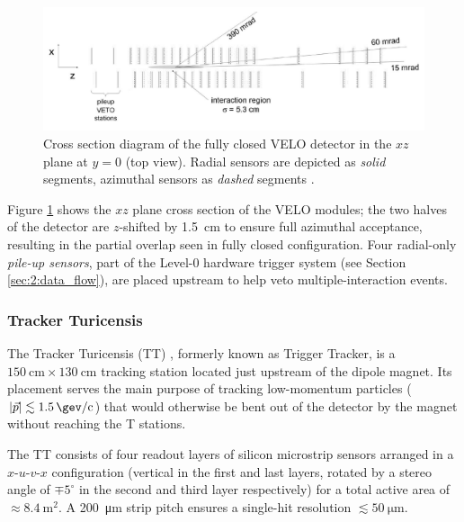 \begin{figure}[t]
	\centering
	\includegraphics[width=\textwidth]{graphics/02-lhcb/VELO_xz.png}
	\caption[Cross section diagram of the VELO detector in the $xz$ plane.]{Cross section diagram of the fully closed VELO detector in the $xz$ plane at $y=0$ (top view). Radial sensors are depicted as \textit{solid} segments, azimuthal sensors as \textit{dashed} segments \cite{Barbosa-Marinho:504321}.}
	\label{fig:2:VELO_xz}
\end{figure}

Figure \ref{fig:2:VELO_xz} shows the $xz$ plane cross section of the VELO modules; the two halves of the detector are $z$-shifted by \SI{1.5}{\centi\meter} to ensure full azimuthal acceptance, resulting in the partial overlap seen in fully closed configuration.
Four radial-only \textit{pile-up sensors}, part of the Level-0 hardware trigger system (see Section \ref{sec:2:data_flow}), are placed upstream to help veto multiple-interaction events.



\subsubsection{Tracker Turicensis}
The Tracker Turicensis (TT) \cite{Gassner:728548}, formerly known as Trigger Tracker, is a $\SI{150}{\centi\meter} \times \SI{130}{\centi\meter}$ tracking station located just upstream of the dipole magnet.
Its placement serves the main purpose of tracking low-momentum particles ($|\vec{p}| \lesssim \SI{1.5}{\gev\per c}$) that would otherwise be bent out of the detector by the magnet without reaching the T stations.

The TT consists of four readout layers of silicon microstrip sensors arranged in a $x$-$u$-$v$-$x$ configuration (vertical in the first and last layers, rotated by a stereo angle of $\mp 5^\circ$ in the second and third layer respectively) for a total active area of $\approx \SI{8.4}{\meter\squared}$.
A \SI{200}{\micro\meter} strip pitch ensures a single-hit resolution $\lesssim \SI{50}{\micro\meter}$.

